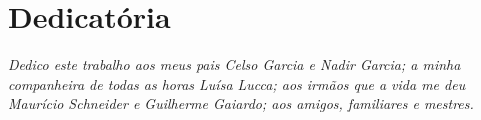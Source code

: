 \chapter*{Dedicatória}


\vfill

\begin{center}
	
	{\sffamily\itshape Dedico este trabalho aos meus pais Celso Garcia e Nadir Garcia; a minha companheira de todas as horas Luísa Lucca; aos irmãos que a vida me deu Maurício Schneider e Guilherme Gaiardo; aos amigos, familiares e mestres.}
	
\end{center}

\vfill

\newpage
